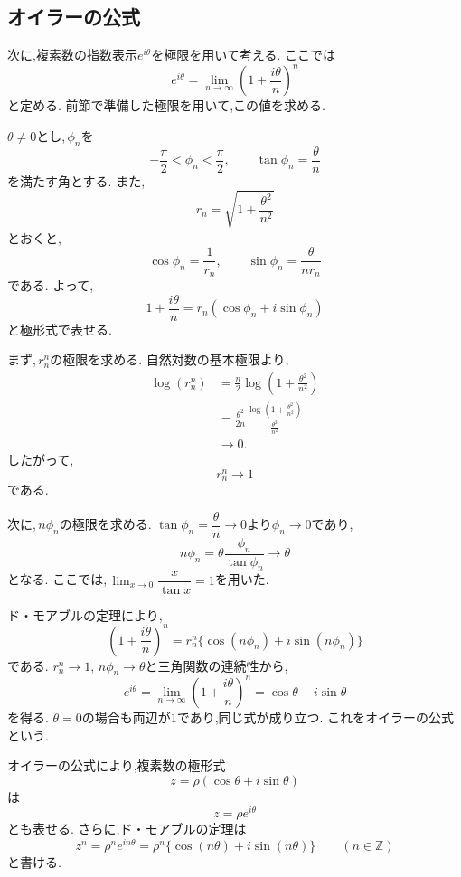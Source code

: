   \subsection{オイラーの公式}\label{節：オイラーの公式}
    次に,複素数の指数表示$e^{i\theta}$を極限を用いて考える.
    ここでは
    \[
      e^{i\theta}
      =
      \lim_{n\to\infty}
      \left(1+\frac{i\theta}{n}\right)^n
    \]
    と定める.
    前節で準備した極限を用いて,この値を求める.

    $\theta\ne0$とし,\,$\phi_n$を
    \[
      -\frac{\pi}{2}<\phi_n<\frac{\pi}{2},
      \qquad
      \tan\phi_n=\frac{\theta}{n}
    \]
    を満たす角とする.
    また,
    \[
      r_n=\sqrt{1+\frac{\theta^2}{n^2}}
    \]
    とおくと,
    \[
      \cos\phi_n=\frac{1}{r_n},
      \qquad
      \sin\phi_n=\frac{\theta}{nr_n}
    \]
    である.
    よって,
    \[
      1+\frac{i\theta}{n}
      =
      r_n(\cos\phi_n+i\sin\phi_n)
    \]
    と極形式で表せる.

    まず,\,$r_n^n$の極限を求める.
    自然対数の基本極限より,
    \begin{align*}
      \log(r_n^n)
        &=
        \frac{n}{2}
        \log\left(1+\frac{\theta^2}{n^2}\right)\\
        &=
        \frac{\theta^2}{2n}
        \frac{
          \log\left(1+\frac{\theta^2}{n^2}\right)
        }{
          \frac{\theta^2}{n^2}
        }\\
        &\longrightarrow0.
    \end{align*}
    したがって,
    \[
      r_n^n\longrightarrow1
    \]
    である.

    次に,\,$n\phi_n$の極限を求める.
    $\tan\phi_n=\dfrac{\theta}{n}\to0$より$\phi_n\to0$であり,
    \[
      n\phi_n
      =
      \theta\frac{\phi_n}{\tan\phi_n}
      \longrightarrow\theta
    \]
    となる.
    ここでは,\,$\lim_{x\to0}\dfrac{x}{\tan x}=1$を用いた.

    ド・モアブルの定理により,
    \[
      \left(1+\frac{i\theta}{n}\right)^n
      =
      r_n^n
      \{\cos(n\phi_n)+i\sin(n\phi_n)\}
    \]
    である.
    $r_n^n\to1,\,n\phi_n\to\theta$と三角関数の連続性から,
    \[
      e^{i\theta}
      =
      \lim_{n\to\infty}
      \left(1+\frac{i\theta}{n}\right)^n
      =
      \cos\theta+i\sin\theta
    \]
    を得る.
    $\theta=0$の場合も両辺が$1$であり,同じ式が成り立つ.
    これをオイラーの公式という.

    オイラーの公式により,複素数の極形式
    \[
      z=\rho(\cos\theta+i\sin\theta)
    \]
    は
    \[
      z=\rho e^{i\theta}
    \]
    とも表せる.
    さらに,ド・モアブルの定理は
    \[
      z^n
      =
      \rho^n e^{in\theta}
      =
      \rho^n\{\cos(n\theta)+i\sin(n\theta)\}
      \qquad(n\in\mathbb Z)
    \]
    と書ける.

